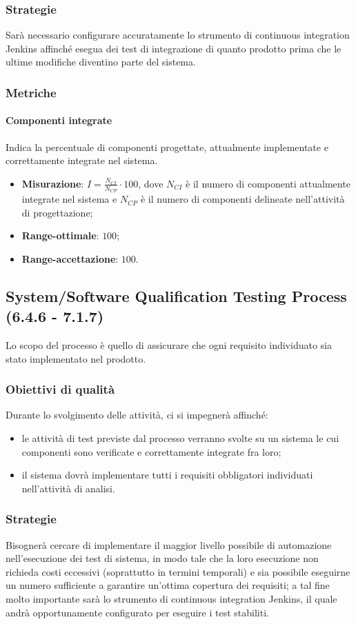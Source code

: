 \subsubsection{Strategie}
Sarà necessario configurare accuratamente lo strumento di continuous integration Jenkins affinché esegua dei test di integrazione di quanto prodotto prima che le ultime modifiche diventino parte del sistema.
\subsubsection{Metriche}
\paragraph{Componenti integrate}
\label{compInt}
Indica la percentuale di componenti progettate, attualmente implementate e correttamente integrate nel sistema.
\begin{itemize}
\item \textbf{Misurazione}: $I=\frac{N_{CI}}{N_{CP}} \cdot 100$, dove $N_{CI}$ è il numero di componenti attualmente integrate nel sistema e $N_{CP}$ è il numero di componenti delineate nell'attività di progettazione;
\item \textbf{Range-ottimale}: $100$;
\item \textbf{Range-accettazione}: $100$.
\end{itemize}

\subsection{System/Software Qualification Testing Process (6.4.6 - 7.1.7)}
\label{sySoQualTest}
Lo scopo del processo è quello di assicurare che ogni requisito individuato sia stato implementato nel prodotto.
\subsubsection{Obiettivi di qualità}
Durante lo svolgimento delle attività, ci si impegnerà affinché:
\begin{itemize}
\item le attività di test previste dal processo verranno svolte su un sistema le cui componenti sono verificate e correttamente integrate fra loro;
\item il sistema dovrà implementare tutti i requisiti obbligatori individuati nell'attività di analisi.
\end{itemize}
\subsubsection{Strategie}
Bisognerà cercare di implementare il maggior livello possibile di automazione nell'esecuzione dei test di sistema, in modo tale che la loro esecuzione non richieda costi eccessivi (soprattutto in termini temporali) e sia possibile eseguirne un numero sufficiente a garantire un'ottima copertura dei requisiti; a tal fine molto importante sarà lo strumento di continuous integration Jenkins, il quale andrà opportunamente configurato per eseguire i test stabiliti.
